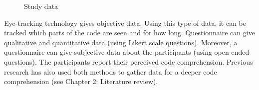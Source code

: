 \begin{figure} [H]
  \centering
  
  \caption{Study data}
  \label{fig:AnhangsChor}




\end{figure}

 

Eye-tracking technology gives objective data. Using this type of data, it can be tracked which parts of the code are seen and for how long. Questionnaire can give qualitative and quantitative data (using Likert scale questions). Moreover, a questionnaire can give subjective data about the participants (using open-ended questions). The participants report their perceived code comprehension.  
Previous research has also used both methods to gather data for a deeper code comprehension (see Chapter 2: Literature review). 


